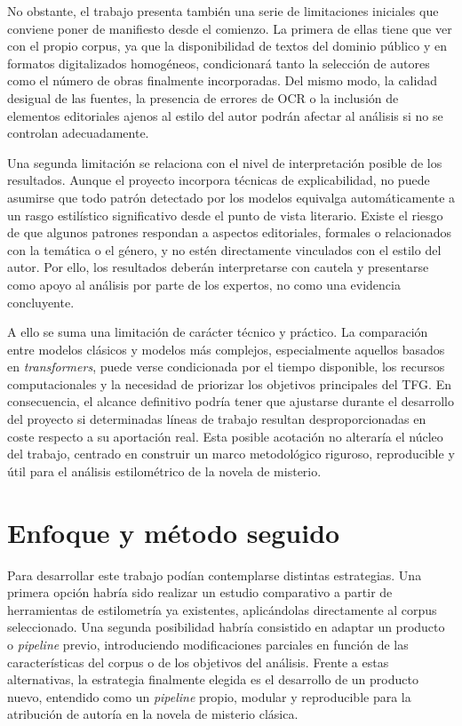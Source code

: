\documentclass[IB]{TFUOC}%
\begin{document}
No obstante, el trabajo presenta también una serie de limitaciones iniciales que conviene poner de manifiesto desde el comienzo. La primera de ellas tiene que ver con el propio corpus, ya que la disponibilidad de textos del dominio público y en formatos digitalizados homogéneos, condicionará tanto la selección de autores como el número de obras finalmente incorporadas. Del mismo modo, la calidad desigual de las fuentes, la presencia de errores de OCR o la inclusión de elementos editoriales ajenos al estilo del autor podrán afectar al análisis si no se controlan adecuadamente.

Una segunda limitación se relaciona con el nivel de interpretación posible de los resultados. Aunque el proyecto incorpora técnicas de explicabilidad, no puede asumirse que todo patrón detectado por los modelos equivalga automáticamente a un rasgo estilístico significativo desde el punto de vista literario. Existe el riesgo de que algunos patrones respondan a aspectos editoriales, formales o relacionados con la temática o el género, y no estén directamente vinculados con el estilo del autor. Por ello, los resultados deberán interpretarse con cautela y presentarse como apoyo al análisis por parte de los expertos, no como una evidencia concluyente.

A ello se suma una limitación de carácter técnico y práctico. La comparación entre modelos clásicos y modelos más complejos, especialmente aquellos basados en \textit{transformers}, puede verse condicionada por el tiempo disponible, los recursos computacionales y la necesidad de priorizar los objetivos principales del TFG. En consecuencia, el alcance definitivo podría tener que ajustarse durante el desarrollo del proyecto si determinadas líneas de trabajo resultan desproporcionadas en coste respecto a su aportación real. Esta posible acotación no alteraría el núcleo del trabajo, centrado en construir un marco metodológico riguroso, reproducible y útil para el análisis estilométrico de la novela de misterio.

\section{Enfoque y método seguido}

Para desarrollar este trabajo podían contemplarse distintas estrategias. Una primera opción habría sido realizar un estudio comparativo a partir de herramientas de estilometría ya existentes, aplicándolas directamente al corpus seleccionado. Una segunda posibilidad habría consistido en adaptar un producto o \textit{pipeline} previo, introduciendo modificaciones parciales en función de las características del corpus o de los objetivos del análisis. Frente a estas alternativas, la estrategia finalmente elegida es el desarrollo de un producto nuevo, entendido como un \textit{pipeline} propio, modular y reproducible para la atribución de autoría en la novela de misterio clásica.
\end{document}
